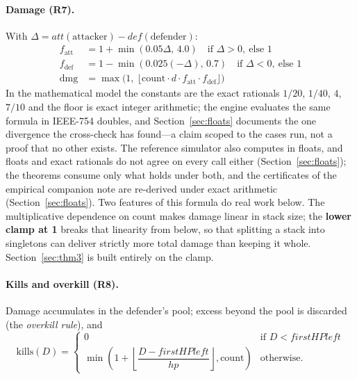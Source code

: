 \documentclass[11pt,a4paper]{article}
\theoremstyle{plain}
\theoremstyle{definition}
\theoremstyle{plain}
\theoremstyle{definition}
\theoremstyle{remark}
\begin{document}
\paragraph{Damage (R7).} With $\Delta=\mathit{att}(\text{attacker})-\mathit{def}(\text{defender})$:
\begin{align*}
  f_{\mathrm{att}} &= 1+\min(0.05\Delta,\,4.0) \quad\text{if } \Delta>0,\ \text{else } 1\\
  f_{\mathrm{def}} &= 1-\min(0.025(-\Delta),\,0.7) \quad\text{if } \Delta<0,\ \text{else } 1\\
  \mathrm{dmg} &= \max\bigl(1,\ \lfloor \mathrm{count}\cdot d\cdot f_{\mathrm{att}}\cdot
      f_{\mathrm{def}}\rfloor\bigr)
\end{align*}
In the mathematical model the constants are the exact rationals $1/20$, $1/40$, $4$, $7/10$
and the floor is exact integer arithmetic; the engine evaluates the same formula in IEEE-754
doubles, and Section~\ref{sec:floats} documents the one divergence the cross-check has
found---a claim scoped to the cases run, not a proof that no other exists. The reference
simulator also computes in floats, and floats and exact rationals do not agree on every call
either (Section~\ref{sec:floats}); the theorems consume only what holds under both, and the
certificates of the empirical companion note are re-derived under exact arithmetic
(Section~\ref{sec:floats}). Two
features of this formula do real work below. The multiplicative dependence on
$\mathrm{count}$ makes damage linear in stack size; the \textbf{lower clamp at 1} breaks that
linearity from below, so that splitting a stack into singletons can deliver strictly more
total damage than keeping it whole. Section~\ref{sec:thm3} is built entirely on the clamp.

\paragraph{Kills and overkill (R8).} Damage accumulates in the defender's pool; excess beyond
the pool is discarded (the \emph{overkill rule}), and
\[
  \mathrm{kills}(D)=\begin{cases}
    0 & \text{if } D<\mathit{firstHPleft}\\[2pt]
    \min\!\left(1+\left\lfloor\dfrac{D-\mathit{firstHPleft}}{\mathit{hp}}\right\rfloor,
      \mathrm{count}\right) & \text{otherwise.}
  \end{cases}
\]
\end{document}
